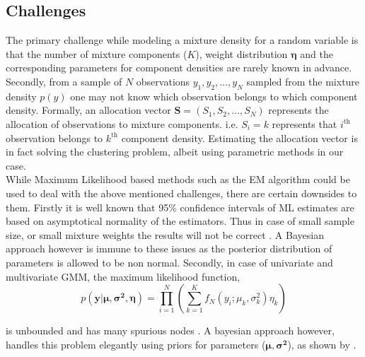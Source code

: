 \subsection{Challenges}
\label{subsec : challenges_mixture_density}
The primary challenge while modeling a mixture density for a random variable is that the number of mixture components ($K$), weight distribution $\boldsymbol{\eta}$ and the corresponding parameters for component densities are rarely known in advance. Secondly, from a sample of $N$ observations $y_1, y_2, \ldots, y_N$ sampled from the mixture density $p(y)$ one may not know which observation belongs to which component density. Formally, an allocation vector $\boldsymbol{S} = (S_1, S_2, \ldots, S_N)$ represents the allocation of observations to mixture components. i.e. $S_i = k$ represents that $i^\text{th}$ observation belongs to $k^\text{th}$ component density. Estimating the allocation vector is in fact solving the clustering problem, albeit using parametric methods in our case.\\

While Maximum Likelihood based methods such as the EM algorithm could be used to deal with the above mentioned challenges, there are certain downsides to them. Firstly it is well known that 95\% confidence intervals of ML estimates are based on asymptotical normality of the estimators. Thus in case of small sample size, or small mixture weights the results will not be correct \citep[pg. 35]{fruhwirth-schnatter_finite_2013}. A Bayesian approach however is immune to these issues as the posterior distribution of parameters is allowed to be non normal. Secondly, in case of univariate and multivariate GMM, the maximum likelihood function,\\

$$ p(\boldsymbol{y}|\boldsymbol{\mu}, \boldsymbol{\sigma^2}, \boldsymbol{\eta}) = \prod_{i=1}^{N} (\sum_{k=1}^{K} f_N(y_i; \mu_k, \sigma^2_k) \eta_k)$$

is unbounded and has many spurious nodes \citep{kiefer_consistency_1956,day_estimating_1969}. A bayesian approach however, handles this problem elegantly using priors for parameters ($\boldsymbol{\mu}, \boldsymbol{\sigma^2}$), as shown by \citet[pg. 176]{fruhwirth-schnatter_finite_2013}.

